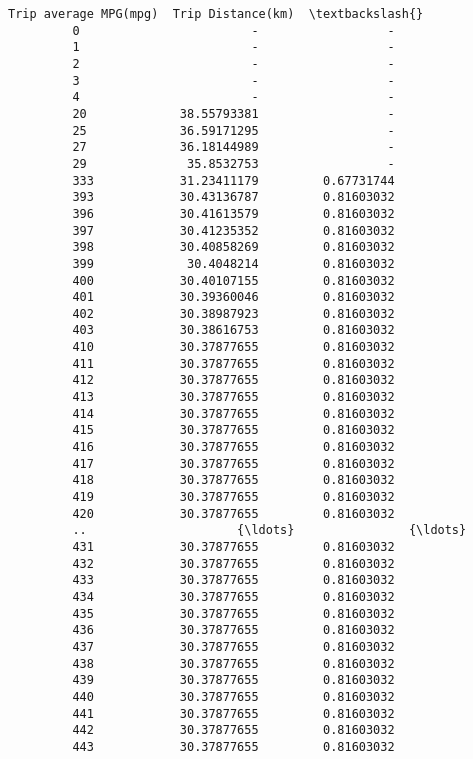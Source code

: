 \documentclass[11pt]{article}
\begin{document}
\begin{Verbatim}[commandchars=\\\{\}]
              Trip average MPG(mpg)  Trip Distance(km)  \textbackslash{}
         0                        -                  -   
         1                        -                  -   
         2                        -                  -   
         3                        -                  -   
         4                        -                  -   
         20             38.55793381                  -   
         25             36.59171295                  -   
         27             36.18144989                  -   
         29              35.8532753                  -   
         333            31.23411179         0.67731744   
         393            30.43136787         0.81603032   
         396            30.41613579         0.81603032   
         397            30.41235352         0.81603032   
         398            30.40858269         0.81603032   
         399             30.4048214         0.81603032   
         400            30.40107155         0.81603032   
         401            30.39360046         0.81603032   
         402            30.38987923         0.81603032   
         403            30.38616753         0.81603032   
         410            30.37877655         0.81603032   
         411            30.37877655         0.81603032   
         412            30.37877655         0.81603032   
         413            30.37877655         0.81603032   
         414            30.37877655         0.81603032   
         415            30.37877655         0.81603032   
         416            30.37877655         0.81603032   
         417            30.37877655         0.81603032   
         418            30.37877655         0.81603032   
         419            30.37877655         0.81603032   
         420            30.37877655         0.81603032   
         ..                     {\ldots}                {\ldots}   
         431            30.37877655         0.81603032   
         432            30.37877655         0.81603032   
         433            30.37877655         0.81603032   
         434            30.37877655         0.81603032   
         435            30.37877655         0.81603032   
         436            30.37877655         0.81603032   
         437            30.37877655         0.81603032   
         438            30.37877655         0.81603032   
         439            30.37877655         0.81603032   
         440            30.37877655         0.81603032   
         441            30.37877655         0.81603032   
         442            30.37877655         0.81603032   
         443            30.37877655         0.81603032   

\end{Verbatim}
\end{document}
